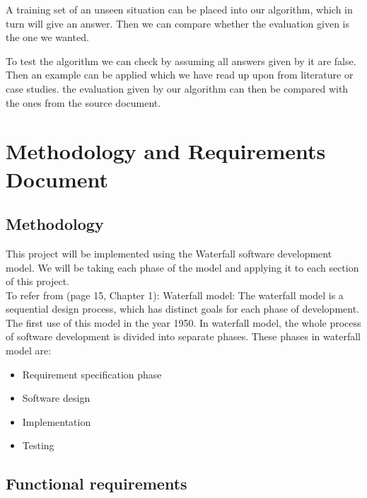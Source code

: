 \documentclass{report}
\begin{document}
A training set of an unseen situation can be placed into our algorithm, which in turn will give an answer. Then we can compare whether the evaluation given is the one we wanted.

To test the algorithm we can check by assuming all answers given by it are false. Then an example can be applied which we have read up upon from literature or case studies. the evaluation given by our algorithm can then be compared with the ones from the source document.


\chapter{Methodology and Requirements Document}
\label{cha:methrecdoc}

\section{Methodology}
\label{sec:meth}
This project will be implemented using the Waterfall software development model. We will be taking each phase of the model and applying it to each section of this project.\\ 

To refer from \cite{Hamlet2001TheEngineeringofSoftware}(page 15, Chapter 1): Waterfall model: The waterfall model is a sequential design process, which has distinct goals for each phase of development. The first use of this model in the year 1950. In waterfall model, the whole process of software development is divided into separate phases. These phases in waterfall model are:
\begin{itemize}
\item Requirement specification phase
\item Software design
\item Implementation 
\item Testing 
\end{itemize}



\section{Functional requirements}
\label{sec:functreq}
\end{document}
